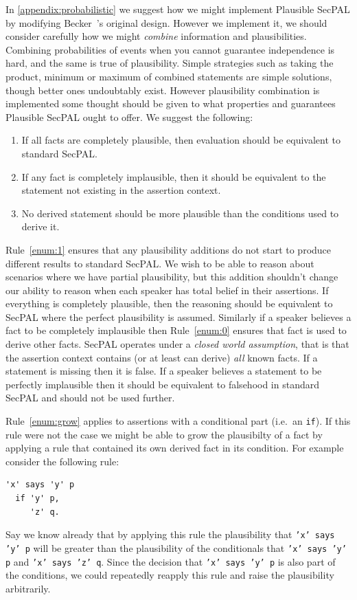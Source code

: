 \documentclass[thesis.tex]{subfiles}
\begin{document}
In \autoref{appendix:probabilistic} we suggest how we might implement Plausible
SecPAL by modifying Becker~\etal's original design. However we implement it, we
should consider carefully how we might \emph{combine} information and
plausibilities. Combining probabilities of events when you cannot guarantee
independence is hard, and the same is true of plausibility. Simple strategies
such as taking the product, minimum or maximum of combined statements are simple
solutions, though better ones undoubtably exist. However plausibility
combination is implemented some thought should be given to what properties and
guarantees Plausible SecPAL ought to offer. We suggest the following:

\begin{enumerate}
\item \label{enum:1} If all facts are completely plausible, then evaluation should be
  equivalent to standard SecPAL.
\item \label{enum:0} If any fact is completely  implausible, then it should be equivalent
  to the statement not existing in the assertion context.
\item \label{enum:grow} No derived statement should be more plausible than the conditions used
  to derive it.
\end{enumerate}

Rule~\ref{enum:1} ensures that any plausibility additions do not start to
produce different results to standard SecPAL. We wish to be able to reason about
scenarios where we have partial plausibility, but this addition shouldn't change
our ability to reason when each speaker has total belief in their assertions. If
everything is completely plausible, then the reasoning should be equivalent to
SecPAL where the perfect plausibility is assumed. Similarly if a speaker
believes a fact to be completely implausible then Rule~\ref{enum:0} ensures that
fact is used to derive other facts. SecPAL operates under a \emph{closed world
assumption}, that is that the assertion context contains (or at least can
derive) \emph{all} known facts. If a statement is missing then it is false. If a
speaker believes a statement to be perfectly implausible then it should be
equivalent to falsehood in standard SecPAL and should not be used further.

Rule~\ref{enum:grow} applies to assertions with a conditional part (i.e.~an
\texttt{if}). If this rule were not the case we might be able to grow the
plausibilty of a fact by applying a rule that contained its own derived fact in
its condition. For example consider the following rule:
\begin{lstlisting}
'x' says 'y' p
  if 'y' p,
     'z' q.
\end{lstlisting} Say we know already that by applying this rule the plausibility
that \texttt{'x' says 'y' p} will be greater than the plausibility of the
conditionals that \texttt{'x' says 'y' p} and \texttt{'x' says 'z' q}. Since the
decision that \texttt{'x' says 'y' p} is also part of the conditions, we could
repeatedly reapply this rule and raise the plausibility arbitrarily.
\end{document}
